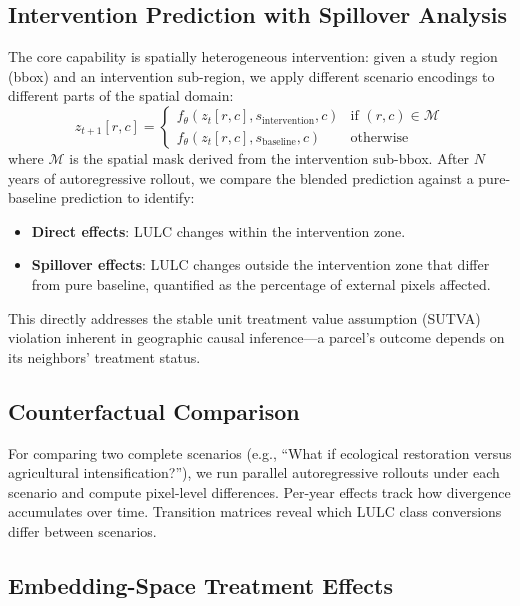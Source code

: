 \documentclass{article}
\begin{document}
\subsection{Intervention Prediction with Spillover Analysis}

The core capability is spatially heterogeneous intervention: given a study region (bbox) and an intervention sub-region, we apply different scenario encodings to different parts of the spatial domain:
\begin{equation}
z_{t+1}[r,c] = \begin{cases}
f_\theta(z_t[r,c], s_{\text{intervention}}, c) & \text{if } (r,c) \in \mathcal{M} \\
f_\theta(z_t[r,c], s_{\text{baseline}}, c) & \text{otherwise}
\end{cases}
\end{equation}
where $\mathcal{M}$ is the spatial mask derived from the intervention sub-bbox. After $N$ years of autoregressive rollout, we compare the blended prediction against a pure-baseline prediction to identify:
\begin{itemize}
\item \textbf{Direct effects}: LULC changes within the intervention zone.
\item \textbf{Spillover effects}: LULC changes outside the intervention zone that differ from pure baseline, quantified as the percentage of external pixels affected.
\end{itemize}

This directly addresses the stable unit treatment value assumption (SUTVA) violation inherent in geographic causal inference---a parcel's outcome depends on its neighbors' treatment status.

\subsection{Counterfactual Comparison}

For comparing two complete scenarios (e.g., ``What if ecological restoration versus agricultural intensification?''), we run parallel autoregressive rollouts under each scenario and compute pixel-level differences. Per-year effects track how divergence accumulates over time. Transition matrices reveal which LULC class conversions differ between scenarios.

\subsection{Embedding-Space Treatment Effects}
\end{document}
